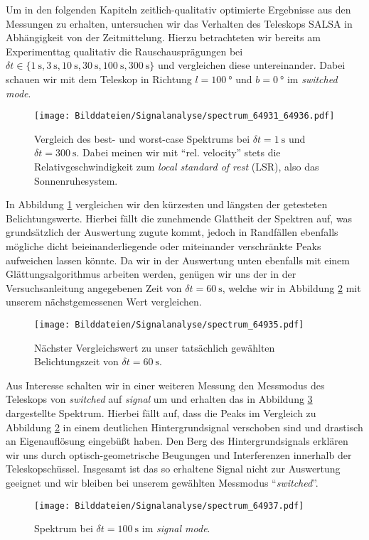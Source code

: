 \documentclass[../../main.tex]{subfiles}
\begin{document}
    Um in den folgenden Kapiteln zeitlich-qualitativ optimierte Ergebnisse aus den Messungen zu erhalten, untersuchen wir das Verhalten des Teleskops SALSA in Abhängigkeit von der Zeitmittelung. Hierzu betrachteten wir bereits am Experimenttag qualitativ die Rauschausprägungen bei $\delta t\in\{\SI{1}{\s},\SI{3}{\s},\SI{10}{\s},\SI{30}{\s},\SI{100}{\s},\SI{300}{\s}\}$ und vergleichen diese untereinander. Dabei schauen wir mit dem Teleskop in Richtung $l = \SI{100}{\degree}$ und $b = \SI{0}{\degree}$ im \emph{switched mode}.
    \begin{figure}[H]
        \centering
        \texttt{[image: Bilddateien/Signalanalyse/spectrum\_64931\_64936.pdf]}
        \caption{Vergleich des best- und worst-case Spektrums bei $\delta t = \SI{1}{\s}$ und $\delta t = \SI{300}{\s}$. Dabei meinen wir mit \enquote{rel. velocity} stets die Relativgeschwindigkeit zum \emph{local standard of rest} (LSR), also das Sonnenruhesystem.}
        \label{fig:bestworstcomp}
    \end{figure}
    In Abbildung \ref{fig:bestworstcomp} vergleichen wir den kürzesten und längsten der getesteten Belichtungswerte. Hierbei fällt die zunehmende Glattheit der Spektren auf, was grundsätzlich der Auswertung zugute kommt, jedoch in Randfällen ebenfalls mögliche dicht beieinanderliegende oder miteinander verschränkte Peaks aufweichen lassen könnte. Da wir in der Auswertung unten ebenfalls mit einem Glättungsalgorithmus arbeiten werden, genügen wir uns der in der Versuchsanleitung \cite{doc:SALSAStudentManual} angegebenen Zeit von $\delta t = \SI{60}{\s}$, welche wir in Abbildung \ref{fig:nexttime100} mit unserem nächstgemessenen Wert vergleichen.
    \begin{figure}[H]
        \centering
        \texttt{[image: Bilddateien/Signalanalyse/spectrum\_64935.pdf]}
        \caption{Nächster Vergleichswert zu unser tatsächlich gewählten Belichtungszeit von $\delta t = \SI{60}{\s}$.}
        \label{fig:nexttime100}
    \end{figure}
    Aus Interesse schalten wir in einer weiteren Messung den Messmodus des Teleskops von \emph{switched} auf \emph{signal} um und erhalten das in Abbildung \ref{fig:signalmode} dargestellte Spektrum. Hierbei fällt auf, dass die Peaks im Vergleich zu Abbildung \ref{fig:nexttime100} in einem deutlichen Hintergrundsignal verschoben sind und drastisch an Eigenauflösung eingebüßt haben. Den Berg des Hintergrundsignals erklären wir uns durch optisch-geometrische Beugungen und Interferenzen innerhalb der Teleskopschüssel. Insgesamt ist das so erhaltene Signal nicht zur Auswertung geeignet und wir bleiben bei unserem gewählten Messmodus \enquote{\emph{switched}}.

    \begin{figure}[H]
        \centering
        \texttt{[image: Bilddateien/Signalanalyse/spectrum\_64937.pdf]}
        \caption{Spektrum bei $\delta t = \SI{100}{\s}$ im \emph{signal mode}.}
        \label{fig:signalmode}
    \end{figure}
    
\end{document}
